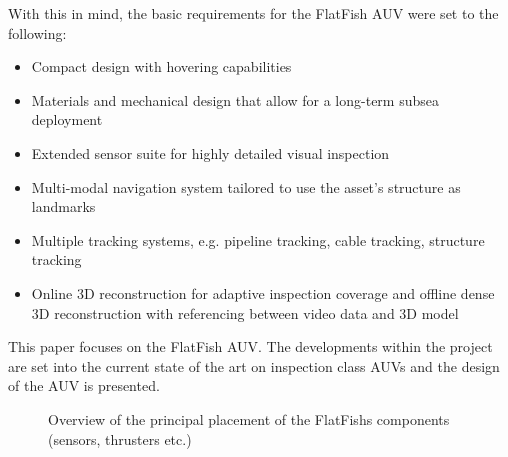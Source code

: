 \documentclass[conference]{IEEEtran}
\begin{document}
With this in mind, the basic requirements for the FlatFish AUV were set to the following:

\begin{itemize}
    \item Compact design with hovering capabilities
    \item Materials and mechanical design that allow for a long-term subsea deployment
    \item Extended sensor suite for highly detailed visual inspection
    \item Multi-modal navigation system tailored to use the asset's structure as landmarks
    \item Multiple tracking systems, e.g. pipeline tracking, cable tracking, structure
        tracking
    \item Online 3D reconstruction for adaptive inspection coverage and offline dense 3D
        reconstruction with referencing between video data and 3D model
\end{itemize}

This paper focuses on the FlatFish AUV. The developments within the project are set into
the current state of the art on inspection class AUVs and the design of the AUV is
presented.


\begin{figure}[!t]
	\begin{center}
		\centering
		\hfil
		\caption{Overview of the principal placement of the FlatFishs components (sensors, 
		thrusters etc.)}
		\label{fig:sensor_placement}
	\end{center}
\end{figure}
\end{document}
